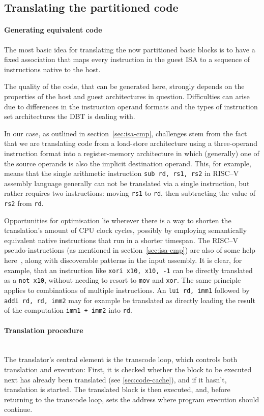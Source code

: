 \subsection{Translating the partitioned code}
\paragraph{Generating equivalent code}
The most basic idea for translating the now partitioned basic blocks is to have a fixed association that maps every instruction in the guest ISA to a sequence of instructions native to the host.

The quality of the code, that can be generated here, strongly depends on the properties of the host and guest architectures in question.
Difficulties can arise due to differences in the instruction operand formats and the types of instruction set architectures the DBT is dealing with.

In our case, as outlined in section~\ref{sec:isa-cmp}, challenges stem from the fact that we are translating code from a load-store architecture using a three-operand instruction format into a register-memory architecture in which (generally) one of the source operands is also the implicit destination operand.
This, for example, means that the single arithmetic instruction \texttt{sub~rd,~rs1,~rs2} in RISC--V assembly language generally can not be translated via a single instruction, but rather requires two instructions: moving \texttt{rs1} to \texttt{rd}, then subtracting the value of \texttt{rs2} from \texttt{rd}.

Opportunities for optimisation lie wherever there is a way to shorten the translation's amount of CPU clock cycles, possibly by employing semantically equivalent native instructions that run in a shorter timespan.
The RISC--V pseudo-instructions (as mentioned in section~\ref{sec:isa-cmp}) are also of some help here~\cite[S. 139]{riscvspec}, along with discoverable patterns in the input assembly.
It is clear, for example, that an instruction like \texttt{xori~x10,~x10,~-1} can be directly translated as a \texttt{not x10}, without needing to resort to \texttt{mov} and \texttt{xor}.
The same principle applies to combinations of multiple instructions.
An \texttt{lui~rd,~imm1} followed by \texttt{addi~rd,~rd,~imm2} may for example be translated as directly loading the result of the computation \texttt{imm1~+~imm2} into \texttt{rd}.

\paragraph{Translation procedure} \mbox{}\\
The translator's central element is the transcode loop, which controls both translation and execution:
First, it is checked whether the block to be executed next has already been translated (see \ref{sec:code-cache}), and if it hasn't, translation is started.
The translated block is then executed, and, before returning to the transcode loop, sets the address where program execution should continue.

